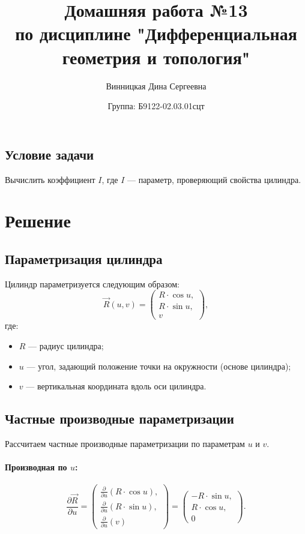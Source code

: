 \documentclass{article}
\title{\vspace{-1cm}Домашняя работа №13 \\ по дисциплине "Дифференциальная геометрия и топология"}
\author{Винницкая Дина Сергеевна}
\date{Группа: Б9122-02.03.01сцт}
\begin{document}
	
	\maketitle


        \subsection*{Условие задачи}
        Вычислить коэффициент \(I\), где \(I\) — параметр, проверяющий свойства цилиндра.

            
        \section*{Решение}
       \subsection*{Параметризация цилиндра}

Цилиндр параметризуется следующим образом:
\[
\vec{R}(u, v) = \begin{pmatrix}
R \cdot \cos u, \\
R \cdot \sin u, \\
v
\end{pmatrix},
\]
где:
\begin{itemize}
    \item \(R\) — радиус цилиндра;
    \item \(u\) — угол, задающий положение точки на окружности (основе цилиндра);
    \item \(v\) — вертикальная координата вдоль оси цилиндра.
\end{itemize}

\subsection*{Частные производные параметризации}

Рассчитаем частные производные параметризации по параметрам \(u\) и \(v\).

\paragraph{Производная по \(u\):}
\[
\frac{\partial \vec{R}}{\partial u} = \begin{pmatrix}
\frac{\partial}{\partial u}(R \cdot \cos u), \\
\frac{\partial}{\partial u}(R \cdot \sin u), \\
\frac{\partial}{\partial u}(v)
\end{pmatrix}
= \begin{pmatrix}
-R \cdot \sin u, \\
R \cdot \cos u, \\
0
\end{pmatrix}.
\]
\end{document}
